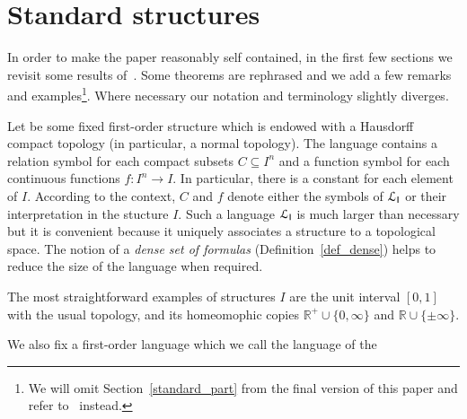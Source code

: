 \documentclass{amsproc}
\renewcommand*{\emph}[1]{%
   \smash{\tikz[baseline]\node[rectangle, fill=teal!25, rounded corners, inner xsep=0.5ex, inner ysep=0.2ex, anchor=base, minimum height = 2.7ex]{\strut #1};}}
\begin{document}
\section{Standard structures}\label{uno}

\def\ceq#1#2#3{\parbox[t]{23ex}{$\displaystyle #1$}\parbox{6ex}{\hfil $#2$}{$\displaystyle #3$}}

In order to make the paper reasonably self contained, in the first few sections we revisit some results of~\cite{clcl}.
Some theorems are rephrased and we add a few remarks and examples\footnote{We will omit Section~\ref{standard_part} from the final version of this paper and refer to~\cite{clcl} instead. 
}.
Where necessary our notation and terminology slightly diverges.

Let \emph{$I$\/} be some fixed first-order structure which is endowed with a Hausdorff compact topology (in particular, a normal topology).
The language \emph{${\EuScript L}_{\sf I}$\/} contains a relation symbol for each compact subsets $C\subseteq I^n$ and a function symbol for each continuous functions $f:I^n\to I$.
In particular, there is a constant for each element of $I$.
According to the context, $C$ and $f$ denote either the symbols of ${\EuScript L}_{\sf I}$ or their interpretation in the stucture $I$.
Such a language ${\EuScript L}_{\sf I}$ is much larger than necessary but it is convenient because it uniquely associates a structure to a topological space.
The notion of a \textit{dense set of formulas\/} (Definition~\ref{def_dense}) helps to reduce the size of the language when required.

The most straightforward examples of structures $I$ are the unit interval $[0,1]$ with the usual topology, and its homeomophic copies $\mathds{R}^+\cup\{0,\infty\}$ and $\mathds{R}\cup\{\pm\infty\}$.

We also fix a first-order language \emph{${\EuScript L}_{\sf H}$\/} which we call the language of the \emph{home sort.}
\end{document}

